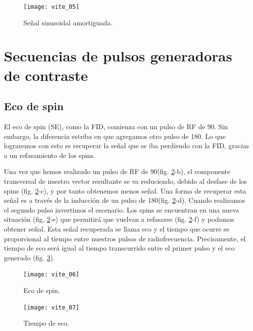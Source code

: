 \begin{figure}[htb]
\begin{figg}
   \texttt{[image: vite\_05]}
   \caption{Señal sinusoidal amortiguada.}
 \label{fig:seq_fid}
 \end{figg}
\end{figure}

\section{Secuencias de pulsos generadoras de contraste}

\subsection{Eco de spin}
El eco de spin (SE), como la FID, comienza con un pulso de  RF de 90\degrees. Sin embargo, la diferencia estriba en que agregamos otro pulso de 180\degrees. Lo que lograremos con esto es recuperar la señal que se iba perdiendo con la FID, gracias a un refasamiento de los spins. 

Una vez que hemos realizado un pulso de RF de 90\degrees (fig. \ref{fig:seq_spinecho}-b), el componente transversal de nuestro vector resultante se va reduciendo, debido al desfase de los spins (fig. \ref{fig:seq_spinecho}-c), y por tanto obtenemos menos señal. Una forma de recuperar esta señal es a través de la inducción de un pulso de 180\degrees (fig. \ref{fig:seq_spinecho}-d). 
Cuando realizamos el segundo pulso invertimos el escenario. Los spins se encuentran en una nueva situación (fig. \ref{fig:seq_spinecho}-e) que permitirá que vuelvan a refasarse (fig. \ref{fig:seq_spinecho}-f) y podamos obtener señal. Esta señal recuperada se llama eco y el tiempo que ocurre es proporcional al tiempo entre nuestros pulsos de radiofrecuencia. Precisamente, el tiempo de eco será igual al tiempo transcurrido entre el primer pulso y el eco generado (fig. \ref{fig:seq_TE}).



\begin{figure}[htb]
\begin{figg}
   \texttt{[image: vite\_06]}
   \caption{Eco de spin.}
 \label{fig:seq_spinecho}
 \end{figg}
\end{figure}


\begin{figure}[htb]
\begin{figg}
   \texttt{[image: vite\_07]}
   \caption{Tiempo de eco.}
 \label{fig:seq_TE}
 \end{figg}
\end{figure}

